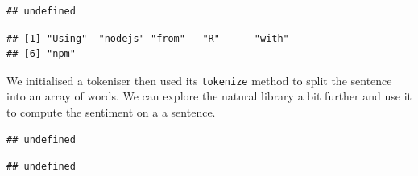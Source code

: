 \documentclass[
]{krantz}
\makeatletter
\newenvironment{Shaded}{\begin{snugshade}}{\end{snugshade}}
\newcommand{\KeywordTok}[1]{\textcolor[rgb]{0.27,0.27,0.27}{\textbf{#1}}}
\newcommand{\NormalTok}[1]{#1}
\newcommand{\OperatorTok}[1]{\textcolor[rgb]{0.43,0.43,0.43}{\textbf{#1}}}
\newcommand{\StringTok}[1]{\textcolor[rgb]{0.5,0.5,0.5}{#1}}
\newenvironment{kframe}{%
\medskip{}
\setlength{\fboxsep}{.8em}
 \def\at@end@of@kframe{}%
 \ifinner\ifhmode%
  \def\at@end@of@kframe{\end{minipage}}%
  \begin{minipage}{\columnwidth}%
 \fi\fi%
 \def\FrameCommand##1{\hskip\@totalleftmargin \hskip-\fboxsep
 \colorbox{shadecolor}{##1}\hskip-\fboxsep
     \hskip-\linewidth \hskip-\@totalleftmargin \hskip\columnwidth}%
 \MakeFramed {\advance\hsize-\width
   \@totalleftmargin\z@ \linewidth\hsize
   \@setminipage}}%
 {\par\unskip\endMakeFramed%
 \at@end@of@kframe}
\renewenvironment{Shaded}{\begin{kframe}}{\end{kframe}}
\makeatother
\begin{document}
\begin{verbatim}
## undefined
\end{verbatim}

\begin{Shaded}
\end{Shaded}

\begin{verbatim}
## [1] "Using"  "nodejs" "from"   "R"      "with"  
## [6] "npm"
\end{verbatim}

We initialised a tokeniser then used its \texttt{tokenize} method to split the sentence into an array of words. We can explore the natural library a bit further and use it to compute the sentiment on a a sentence.

\begin{Shaded}
\end{Shaded}

\begin{verbatim}
## undefined
\end{verbatim}

\begin{Shaded}
\end{Shaded}

\begin{verbatim}
## undefined
\end{verbatim}

\begin{Shaded}
\end{Shaded}
\end{document}
